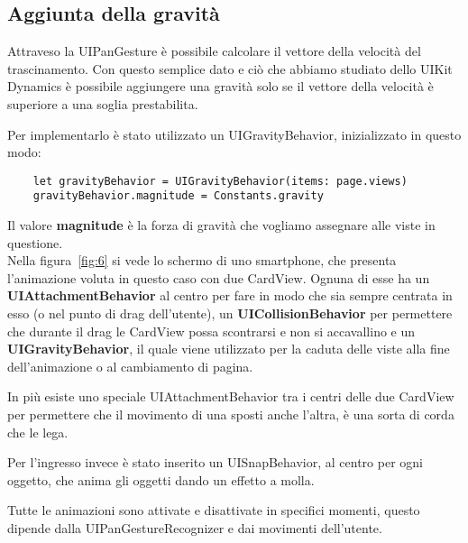 \subsection{Aggiunta della gravità }

Attraveso la UIPanGesture è possibile calcolare il vettore della velocità del trascinamento.
Con questo semplice dato e ciò che abbiamo studiato dello UIKit Dynamics è possibile aggiungere una gravità solo se
il vettore della velocità è superiore a una soglia prestabilita.

Per implementarlo è stato utilizzato un UIGravityBehavior, inizializzato in questo modo:

\begin{verbatim}
    let gravityBehavior = UIGravityBehavior(items: page.views)
    gravityBehavior.magnitude = Constants.gravity
\end{verbatim}

Il valore \textbf{magnitude} è la forza di gravità che vogliamo
assegnare alle viste in questione. \\

Nella figura~\ref{fig:6} si vede lo schermo di uno smartphone, che presenta l'animazione
voluta in questo caso con due CardView. Ognuna di esse ha un \textbf{UIAttachmentBehavior} al
centro per fare in modo che sia sempre centrata in esso (o nel punto di drag dell'utente),
un \textbf{UICollisionBehavior} per permettere che durante il drag le CardView possa scontrarsi e non si accavallino e un \textbf{UIGravityBehavior}, il quale 
viene utilizzato per la caduta delle viste alla fine dell'animazione o al cambiamento di pagina.

In più esiste uno speciale UIAttachmentBehavior tra i centri delle due CardView per permettere che il movimento di una
sposti anche l'altra, è una sorta di corda che le lega.

Per l'ingresso invece è stato inserito un UISnapBehavior, al centro per ogni oggetto, che anima 
gli oggetti dando un effetto a molla.

Tutte le animazioni sono attivate e disattivate in specifici momenti, questo dipende 
dalla UIPanGestureRecognizer e dai movimenti dell'utente.

